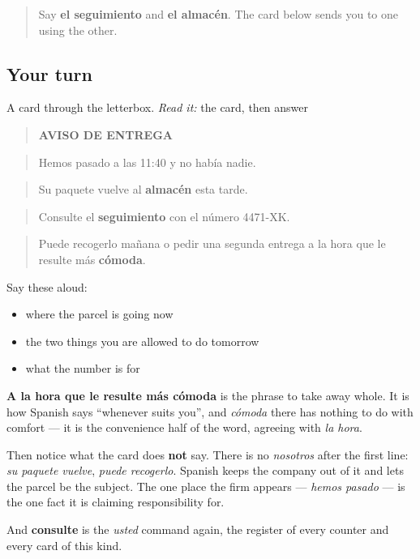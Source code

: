 \begin{quote}
Say \textbf{el seguimiento} and \textbf{el almacén}. The card below sends you to one using the other.
\end{quote}

\subsection*{Your turn}
A card through the letterbox. \emph{Read it:} the card, then answer

\begin{quote}
\textbf{AVISO DE ENTREGA}
\end{quote}

\begin{quote}
Hemos pasado a las 11:40 y no había nadie.
\end{quote}

\begin{quote}
Su paquete vuelve al \textbf{almacén} esta tarde.
\end{quote}

\begin{quote}
Consulte el \textbf{seguimiento} con el número 4471-XK.
\end{quote}

\begin{quote}
Puede recogerlo mañana o pedir una segunda entrega a la hora que le resulte más \textbf{cómoda}.
\end{quote}

Say these aloud:

\begin{itemize}
\raggedright
  \item where the parcel is going now
  \item the two things you are allowed to do tomorrow
  \item what the number is for
\end{itemize}

\begin{culture}
\textbf{A la hora que le resulte más cómoda} is the phrase to take away whole. It is how Spanish says \textquotedblleft{}whenever suits you\textquotedblright{}, and \emph{cómoda} there has nothing to do with comfort — it is the convenience half of the word, agreeing with \emph{la hora}.

Then notice what the card does \textbf{not} say. There is no \emph{nosotros} after the first line: \emph{su paquete vuelve}, \emph{puede recogerlo}. Spanish keeps the company out of it and lets the parcel be the subject. The one place the firm appears — \emph{hemos pasado} — is the one fact it is claiming responsibility for.

And \textbf{consulte} is the \emph{usted} command again, the register of every counter and every card of this kind.
\end{culture}

